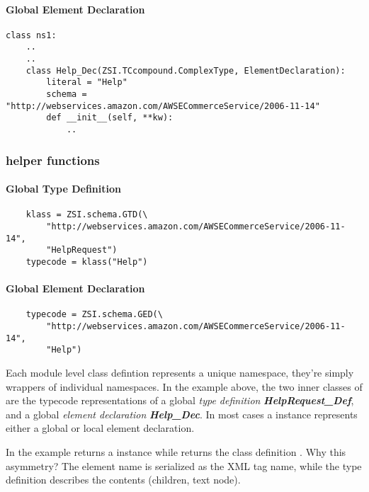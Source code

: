 \paragraph{Global Element Declaration}
\begin{verbatim}
class ns1:
    ..
    ..
    class Help_Dec(ZSI.TCcompound.ComplexType, ElementDeclaration):
        literal = "Help"
        schema = "http://webservices.amazon.com/AWSECommerceService/2006-11-14"
        def __init__(self, **kw):
            ..
\end{verbatim}
\par
\subsubsection{helper functions}
\paragraph{Global Type Definition}
\begin{verbatim}
    klass = ZSI.schema.GTD(\
        "http://webservices.amazon.com/AWSECommerceService/2006-11-14", 
        "HelpRequest")
    typecode = klass("Help")
\end{verbatim}
\par
\paragraph{Global Element Declaration}
\begin{verbatim}
    typecode = ZSI.schema.GED(\
        "http://webservices.amazon.com/AWSECommerceService/2006-11-14", 
        "Help")
\end{verbatim}
\par


Each module level class defintion represents a unique namespace, they're simply
wrappers of individual namespaces.  In the example above, the two inner classes
of \class{ns1} are the typecode representations of a global {\it type
definition} {\it \bfseries HelpRequest_Def}, and a global {\it element
declaration} {\it \bfseries Help_Dec}.  In most cases a 
instance represents either a global or local element declaration.

In the example \function{GED} returns a \class{Help_Dec} instance
while  returns the class definition .  Why
this asymmetry?  
The element name is serialized as the XML tag name, while the type definition
describes the contents (children, text node).  

